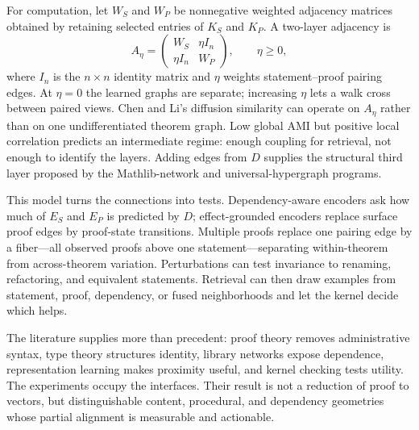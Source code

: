 \documentclass[11pt]{article}
\begin{document}
For computation, let $W_S$ and $W_P$ be nonnegative weighted adjacency matrices obtained by
retaining selected entries of $K_S$ and $K_P$.  A two-layer adjacency is
\[
 A_\eta=\begin{pmatrix}W_S&\eta I_n\\ \eta I_n&W_P\end{pmatrix},\qquad \eta\geq0,
\]
where $I_n$ is the $n\times n$ identity matrix and $\eta$ weights statement--proof pairing edges.
At $\eta=0$ the learned graphs are separate; increasing $\eta$ lets a walk cross between paired
views.  Chen and Li's diffusion similarity can operate on $A_\eta$ rather than on one
undifferentiated theorem graph.  Low global AMI but positive local correlation predicts an
intermediate regime: enough coupling for retrieval, not enough to identify the layers.  Adding
edges from $D$ supplies the structural third layer proposed by the Mathlib-network and
universal-hypergraph programs.

This model turns the connections into tests.  Dependency-aware encoders ask how much of $E_S$ and
$E_P$ is predicted by $D$; effect-grounded encoders replace surface proof edges by proof-state
transitions.  Multiple proofs replace one pairing edge by a fiber---all observed proofs above one
statement---separating within-theorem from across-theorem variation.  Perturbations can test
invariance to renaming, refactoring, and equivalent statements.  Retrieval can then draw examples
from statement, proof, dependency, or fused neighborhoods and let the kernel decide which helps.

The literature supplies more than precedent: proof theory removes administrative syntax, type
theory structures identity, library networks expose dependence, representation learning makes
proximity useful, and kernel checking tests utility.  The experiments occupy the interfaces.  Their
result is not a reduction of proof to vectors, but distinguishable content, procedural, and
dependency geometries whose partial alignment is measurable and actionable.
\end{document}

